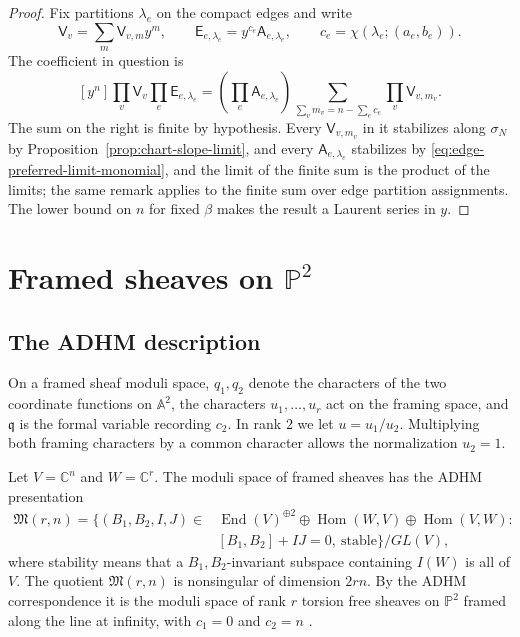 \documentclass{amsart}
\theoremstyle{definition}
\numberwithin{equation}{section}
\newcommand{\C}{\mathbb C}
\newcommand{\End}{\operatorname{End}}
\newcommand{\Hom}{\operatorname{Hom}}
\newcommand{\M}{\mathfrak M}
\begin{document}
\begin{proof}
Fix partitions \(\lambda_e\) on the compact edges and write
\[
 \mathsf V_v=\sum_m \mathsf V_{v,m}y^m,
 \qquad
 \mathsf E_{e,\lambda_e}=y^{c_e}\mathsf A_{e,\lambda_e},
 \qquad
 c_e=\chi(\lambda_e;(a_e,b_e)).
\]
The coefficient in question is
\[
 \left[y^n\right]
 \prod_v\mathsf V_v\prod_e\mathsf E_{e,\lambda_e}
 =\left(\prod_e\mathsf A_{e,\lambda_e}\right)
  \sum_{\sum_v m_v=n-\sum_e c_e}
  \prod_v\mathsf V_{v,m_v}.
\]
The sum on the right is finite by hypothesis.  Every \(\mathsf V_{v,m_v}\) in it stabilizes along \(\sigma_N\) by Proposition~\ref{prop:chart-slope-limit}, and every \(\mathsf A_{e,\lambda_e}\) stabilizes by \eqref{eq:edge-preferred-limit-monomial}, and the limit of the finite sum is the product of the limits; the same remark applies to the finite sum over edge partition assignments.  The lower bound on \(n\) for fixed \(\beta\) makes the result a Laurent series in \(y\).
\end{proof}

\section{Framed sheaves on \texorpdfstring{\(\mathbb P^2\)}{P2}}
\label{sec:ADHM}

\subsection{The ADHM description}
On a framed sheaf moduli space, \(q_1,q_2\) denote the characters of the two coordinate functions on \(\mathbb A^2\), the characters \(u_1,\ldots,u_r\) act on the framing space, and \(\mathfrak q\) is the formal variable recording \(c_2\).  In rank \(2\) we let \(u=u_1/u_2\).  Multiplying both framing characters by a common character allows the normalization \(u_2=1\).  

Let \(V=\C^n\) and \(W=\C^r\).  The moduli space of framed sheaves has the ADHM presentation
\begin{equation}
\begin{aligned}
 \M(r,n)=\bigl\{(B_1,B_2,I,J)\in{}&
 \End(V)^{\oplus2}\oplus\Hom(W,V)\oplus\Hom(V,W):\\
 & [B_1,B_2]+IJ=0,\ \text{stable}\bigr\}/GL(V),
\end{aligned}
\label{eq:ADHM-quotient}
\end{equation}
where stability means that a \(B_1,B_2\)-invariant subspace containing \(I(W)\) is all of \(V\).  The quotient \(\M(r,n)\) is nonsingular of dimension \(2rn\).  By the ADHM correspondence it is the moduli space of rank \(r\) torsion free sheaves on \(\mathbb P^2\) framed along the line at infinity, with \(c_1=0\) and \(c_2=n\) \cite{NakajimaYoshiokaI,NakajimaYoshiokaII}.
\end{document}
